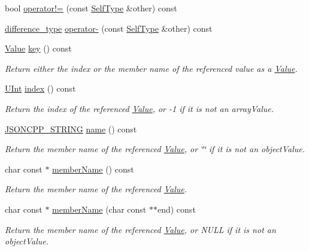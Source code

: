 \begin{DoxyCompactItemize}
\item 
bool \hyperlink{classJson_1_1ValueIteratorBase_a18c2dd42e0bb989ace141bfe9de52792}{operator!=} (const \hyperlink{classJson_1_1ValueIteratorBase_a9d2a940d03ea06d20d972f41a89149ee}{Self\+Type} \&other) const 
\item 
\hyperlink{classJson_1_1ValueIteratorBase_a4e44bf8cbd17ec8d6e2c185904a15ebd}{difference\+\_\+type} \hyperlink{classJson_1_1ValueIteratorBase_ab786787fcad68ca5e8745aaf520fa17f}{operator-\/} (const \hyperlink{classJson_1_1ValueIteratorBase_a9d2a940d03ea06d20d972f41a89149ee}{Self\+Type} \&other) const 
\item 
\hyperlink{classJson_1_1Value}{Value} \hyperlink{classJson_1_1ValueIteratorBase_aa2ff5e79fc96acd4c3cd288e92614fc7}{key} () const 
\begin{DoxyCompactList}\small\item\em Return either the index or the member name of the referenced value as a \hyperlink{classJson_1_1Value}{Value}. \end{DoxyCompactList}\item 
\hyperlink{namespaceJson_a800fb90eb6ee8d5d62b600c06f87f7d4}{U\+Int} \hyperlink{classJson_1_1ValueIteratorBase_aa90591f5f7f8d2f06cc4605816b53738}{index} () const 
\begin{DoxyCompactList}\small\item\em Return the index of the referenced \hyperlink{classJson_1_1Value}{Value}, or -\/1 if it is not an array\+Value. \end{DoxyCompactList}\item 
\hyperlink{json_8hpp_a1e723f95759de062585bc4a8fd3fa4be}{J\+S\+O\+N\+C\+P\+P\+\_\+\+S\+T\+R\+I\+NG} \hyperlink{classJson_1_1ValueIteratorBase_a99026427eb156ce007ef94df002e233f}{name} () const 
\begin{DoxyCompactList}\small\item\em Return the member name of the referenced \hyperlink{classJson_1_1Value}{Value}, or \char`\"{}\char`\"{} if it is not an object\+Value. \end{DoxyCompactList}\item 
char const $\ast$ \hyperlink{classJson_1_1ValueIteratorBase_ac3aa3870761342e47c6486d81f643c6c}{member\+Name} () const 
\begin{DoxyCompactList}\small\item\em Return the member name of the referenced \hyperlink{classJson_1_1Value}{Value}. \end{DoxyCompactList}\item 
char const $\ast$ \hyperlink{classJson_1_1ValueIteratorBase_a543d4e73e3d2d121bc287b24231386c3}{member\+Name} (char const $\ast$$\ast$end) const 
\begin{DoxyCompactList}\small\item\em Return the member name of the referenced \hyperlink{classJson_1_1Value}{Value}, or N\+U\+LL if it is not an object\+Value. \end{DoxyCompactList}\end{DoxyCompactItemize}
